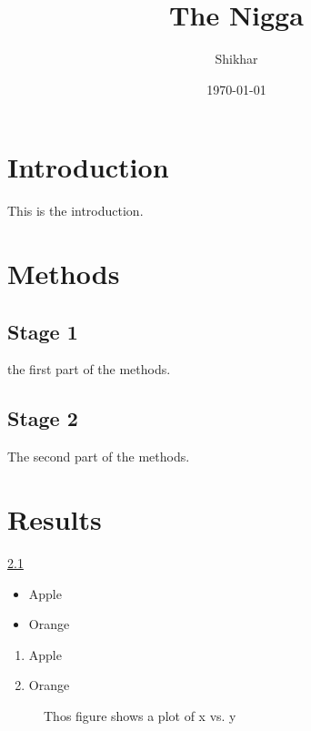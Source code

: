 \documentclass[a4paper,12pt]{article}
\begin{document}
	\title{The Nigga}
	\author{Shikhar}
	\date{\today}
	\maketitle
	\tableofcontents
	\newpage
	\section{Introduction}
	This is the introduction.
	\section{Methods}
	\subsection{Stage 1}
	\label{sec1}
	the first part of the methods.
	\subsection{Stage 2}
	The second part of the methods.
	\section{Results}
	\pageref{sec1}
	\ref{sec1}
	\begin{itemize}
		\item Apple
		\item Orange
    \end{itemize}
	\begin{enumerate}
		\item Apple
		\item Orange
	\end{enumerate}	
  \begin{figure}[h]%
  	
  	\caption{Thos figure shows a plot of x vs. y}
  	\label{Cross-reference_key}
  	\end{figure}
 
\end{document}
